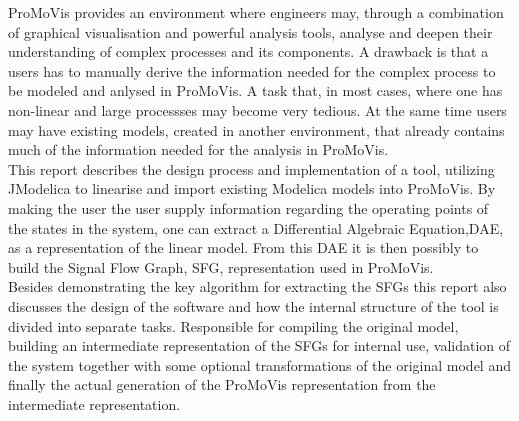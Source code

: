 ProMoVis provides an environment where engineers may, through a combination of graphical visualisation and powerful analysis tools, analyse and deepen their understanding of complex processes and its components. A drawback is that a users has to manually derive the information needed for the complex process to be modeled and anlysed in ProMoVis. A task that, in most cases, where one has non-linear and large processses may become very tedious. At the same time users may have existing models, created in another environment, that already contains much of the information needed for the analysis in ProMoVis.\\\newline This report describes the design process and implementation of a tool, utilizing JModelica to linearise and import existing Modelica models into ProMoVis. By making the user the user supply information regarding the operating points of the states in the system, one can extract a Differential Algebraic Equation,DAE, as a representation of the linear model. From this DAE it is then possibly to build the Signal Flow Graph, SFG, representation used in ProMoVis.\\\newline Besides demonstrating the key algorithm for extracting the SFGs this report also discusses the design of the software and how the internal structure of the tool is divided into separate tasks. Responsible for compiling the original model, building an intermediate representation of the SFGs for internal use, validation of the system together with some optional transformations of the original model and finally the actual generation of the ProMoVis representation from the intermediate representation. 